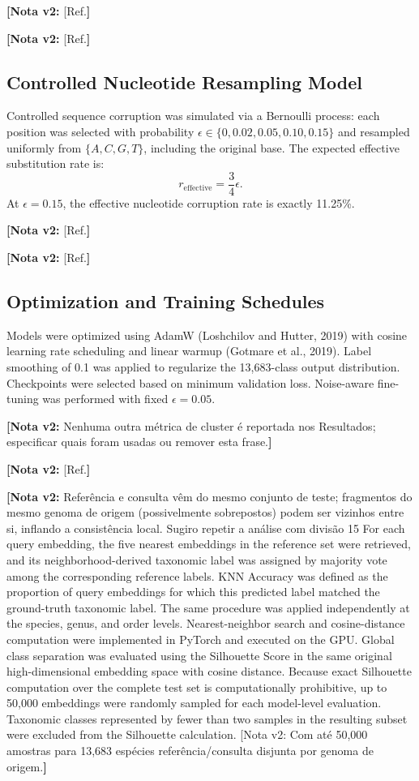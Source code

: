 \documentclass[11pt,a4paper]{article}
\newcommand{\notavdois}[1]{\par\vspace{0.4em}\noindent\colorbox{yellow!25}{\begin{minipage}{0.96\linewidth}\footnotesize\textbf{[Nota v2:} #1\textbf{]}\end{minipage}}\par\vspace{0.4em}}
\begin{document}
\notavdois{[Ref.}


\notavdois{[Ref.}


\subsection{Controlled Nucleotide Resampling Model}
Controlled sequence corruption was simulated via a Bernoulli process: each position was selected with probability $\epsilon \in \{0, 0.02, 0.05, 0.10, 0.15\}$ and resampled uniformly from $\{A, C, G, T\}$, including the original base. The expected effective substitution rate is:
\begin{equation}
r_{\text{effective}} = \frac{3}{4} \epsilon.
\end{equation}
At $\epsilon=0.15$, the effective nucleotide corruption rate is exactly 11.25\%.

\notavdois{[Ref.}


\notavdois{[Ref.}


\subsection{Optimization and Training Schedules}
Models were optimized using AdamW (Loshchilov and Hutter, 2019) with cosine learning rate scheduling and linear warmup (Gotmare et al., 2019). Label smoothing of 0.1 was applied to regularize the 13,683-class output distribution. Checkpoints were selected based on minimum validation loss. Noise-aware fine-tuning was performed with fixed $\epsilon=0.05$.

\notavdois{Nenhuma outra métrica de cluster é reportada nos Resultados; especificar quais foram usadas ou remover esta frase.}


\notavdois{[Ref.}


\notavdois{Referência e consulta vêm do mesmo conjunto de teste; fragmentos do mesmo genoma de origem (possivelmente sobrepostos) podem ser vizinhos entre si, inflando a consistência local. Sugiro repetir a análise com divisão 15 For each query embedding, the five nearest embeddings in the reference set were retrieved, and its neighborhood-derived taxonomic label was assigned by majority vote among the corresponding reference labels. KNN Accuracy was defined as the proportion of query embeddings for which this predicted label matched the ground-truth taxonomic label. The same procedure was applied independently at the species, genus, and order levels. Nearest-neighbor search and cosine-distance computation were implemented in PyTorch and executed on the GPU. Global class separation was evaluated using the Silhouette Score in the same original high-dimensional embedding space with cosine distance. Because exact Silhouette computation over the complete test set is computationally prohibitive, up to 50,000 embeddings were randomly sampled for each model-level evaluation. Taxonomic classes represented by fewer than two samples in the resulting subset were excluded from the Silhouette calculation. [Nota v2: Com até 50,000 amostras para 13,683 espécies referência/consulta disjunta por genoma de origem.}
\end{document}
